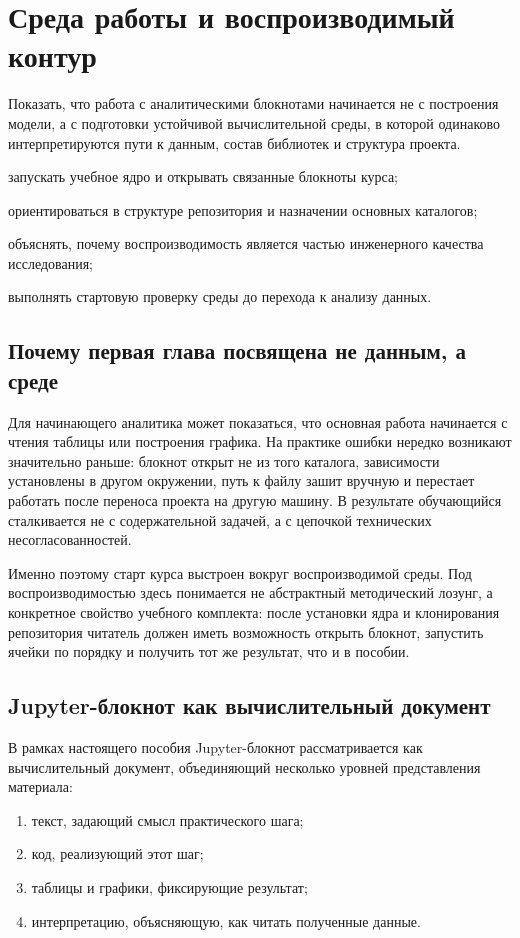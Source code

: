 \chapter{Среда работы и воспроизводимый контур}

\chaptergoals
  {Показать, что работа с аналитическими блокнотами начинается не с построения модели, а с подготовки устойчивой вычислительной среды, в которой одинаково интерпретируются пути к данным, состав библиотек и структура проекта.}
  {
    \item запускать учебное ядро и открывать связанные блокноты курса;
    \item ориентироваться в структуре репозитория и назначении основных каталогов;
    \item объяснять, почему воспроизводимость является частью инженерного качества исследования;
    \item выполнять стартовую проверку среды до перехода к анализу данных.
  }

\section{Почему первая глава посвящена не данным, а среде}

Для начинающего аналитика может показаться, что основная работа начинается с чтения таблицы или построения графика. На практике ошибки нередко возникают значительно раньше: блокнот открыт не из того каталога, зависимости установлены в другом окружении, путь к файлу зашит вручную и перестает работать после переноса проекта на другую машину. В результате обучающийся сталкивается не с содержательной задачей, а с цепочкой технических несогласованностей.

Именно поэтому старт курса выстроен вокруг воспроизводимой среды. Под воспроизводимостью здесь понимается не абстрактный методический лозунг, а конкретное свойство учебного комплекта: после установки ядра и клонирования репозитория читатель должен иметь возможность открыть блокнот, запустить ячейки по порядку и получить тот же результат, что и в пособии.

\section{Jupyter-блокнот как вычислительный документ}

В рамках настоящего пособия Jupyter-блокнот рассматривается как вычислительный документ, объединяющий несколько уровней представления материала:
\begin{enumerate}[leftmargin=1.25cm]
\item текст, задающий смысл практического шага;
\item код, реализующий этот шаг;
\item таблицы и графики, фиксирующие результат;
\item интерпретацию, объясняющую, как читать полученные данные.
\end{enumerate}

